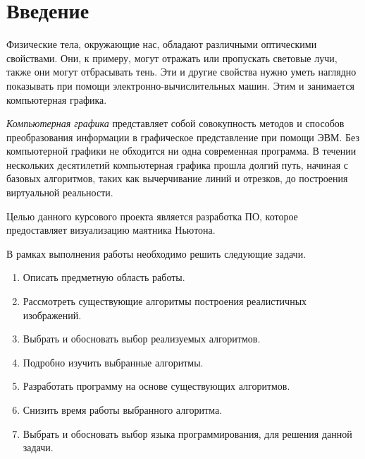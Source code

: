 \newpage
\chapter*{Введение}

Физические тела, окружающие нас, обладают различными оптическими свойствами. Они, к примеру, могут отражать или пропускать световые лучи,
также они могут отбрасывать тень. Эти и другие свойства нужно уметь наглядно показывать при помощи электронно-вычислительных машин.
Этим и занимается компьютерная графика.

\textit{Компьютерная графика} представляет собой совокупность методов и способов преобразования информации в графическое представление при помощи ЭВМ.
Без компьютерной графики не обходится ни одна современная программа. В течении нескольких десятилетий компьютерная графика прошла долгий путь, начиная с базовых
алгоритмов, таких как вычерчивание линий и отрезков, до построения виртуальной реальности.

Целью данного курсового проекта является разработка ПО, которое
предоставляет визуализацию маятника Ньютона.

В рамках выполнения работы необходимо решить следующие задачи.

\begin{enumerate}
	\item Описать предметную область работы.
	\item Рассмотреть существующие алгоритмы построения реалистичных изображений.
	\item Выбрать и обосновать выбор реализуемых алгоритмов.
	\item Подробно изучить выбранные алгоритмы.
	\item Разработать программу на основе существующих алгоритмов.
	\item Снизить время работы выбранного алгоритма.
	\item Выбрать и обосновать выбор языка программирования, для решения данной задачи.
\end{enumerate}

